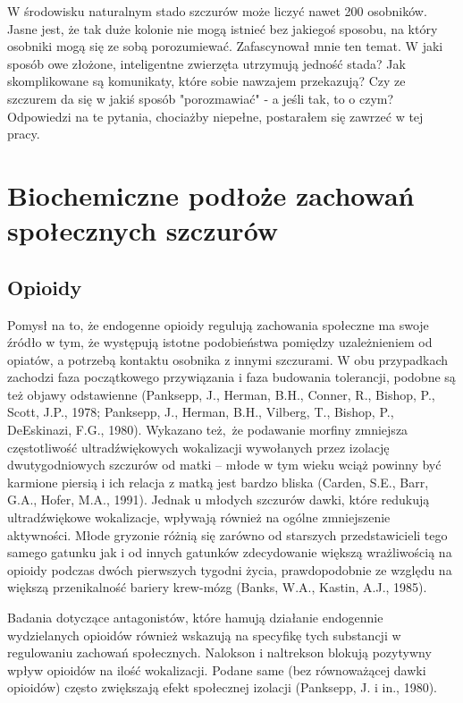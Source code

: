 \documentclass[12pt]{article}
\begin{document}
\pagebreak

W środowisku naturalnym stado szczurów może liczyć nawet 200 osobników. Jasne jest, że tak duże kolonie nie mogą istnieć bez jakiegoś sposobu, na który osobniki mogą się ze sobą porozumiewać. Zafascynował mnie ten temat. W jaki sposób owe złożone, inteligentne zwierzęta utrzymują jedność stada? Jak skomplikowane są komunikaty, które sobie nawzajem przekazują? Czy ze szczurem da się w jakiś sposób "porozmawiać" - a jeśli tak, to o czym? Odpowiedzi na te pytania, chociażby niepełne, postarałem się zawrzeć w tej pracy.

\section{Biochemiczne podłoże zachowań społecznych szczurów}

\subsection{Opioidy}

Pomysł na to, że endogenne opioidy regulują zachowania społeczne ma swoje źródło w tym, że występują istotne podobieństwa pomiędzy uzależnieniem od opiatów, a potrzebą kontaktu osobnika z innymi szczurami. W obu przypadkach zachodzi faza początkowego przywiązania i faza budowania tolerancji, podobne są też objawy odstawienne (Panksepp, J., Herman, B.H., Conner, R., Bishop, P., Scott, J.P., 1978; Panksepp, J., Herman, B.H., Vilberg, T., Bishop, P., DeEskinazi, F.G., 1980). Wykazano też, że podawanie morfiny zmniejsza częstotliwość ultradźwiękowych wokalizacji wywołanych przez izolację dwutygodniowych szczurów od matki -- młode w tym wieku wciąż powinny być karmione piersią i ich relacja z matką jest bardzo bliska (Carden, S.E., Barr, G.A., Hofer, M.A., 1991).
Jednak u młodych szczurów dawki, które redukują ultradźwiękowe wokalizacje, wpływają również na ogólne zmniejszenie aktywności. Młode gryzonie różnią się zarówno od starszych przedstawicieli tego samego gatunku jak i od innych gatunków zdecydowanie większą wrażliwością na opioidy podczas dwóch pierwszych tygodni życia, prawdopodobnie ze względu na większą przenikalność bariery krew-mózg (Banks, W.A., Kastin, A.J., 1985).

Badania dotyczące antagonistów, które hamują działanie endogennie wydzielanych opioidów również wskazują na specyfikę tych substancji w regulowaniu zachowań społecznych. Nalokson i naltrekson blokują pozytywny wpływ opioidów na ilość wokalizacji. Podane same (bez równoważącej dawki opioidów) często zwiększają efekt społecznej izolacji (Panksepp, J. i in., 1980).
\end{document}
